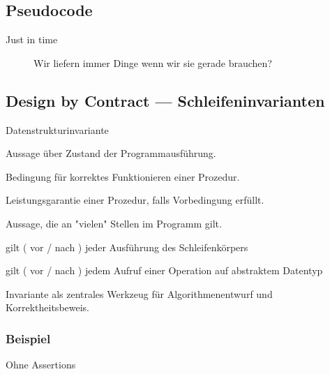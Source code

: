 \documentclass[a4paper]{scrartcl}
\begin{document}
 		\subsection{Pseudocode}
 			\begin{description}
 				\item[Just in time] 
 					Wir liefern immer Dinge wenn wir sie gerade brauchen?
 			\end{description}
 		
 		\subsection{Design by Contract --- Schleifeninvarianten}
 			\begin{labeling}{Datenstrukturinvariante}
 				\item[assert] 
 					Aussage über Zustand der Programmausführung.
 					
 				\item[Vorbedingung] 
 					Bedingung für korrektes Funktionieren einer Prozedur.
 					
 				\item[Nachbedingung] 
 					Leistungsgarantie einer Prozedur, falls Vorbedingung erfüllt.
 					
 				\item[Invariante]
 					Aussage, die an "vielen" Stellen im Programm gilt.
 					 
 				\item[Schleifeninvariante] 
 					gilt ( vor / nach ) jeder Ausführung des Schleifenkörpers
 					
 				\item[Datenstrukturinvariante] 
 					gilt ( vor / nach ) jedem Aufruf einer Operation auf abstraktem Datentyp
 					
 			\end{labeling}
 			Invariante als zentrales Werkzeug für Algorithmenentwurf und Korrektheitsbeweis.	
 		
 		\subsubsection{Beispiel}
 		
 				\begin{algorithm}
 				\caption{Ohne Assertions}
 				\DontPrintSemicolon
 				
 			\end{algorithm}
 			
\end{document}
